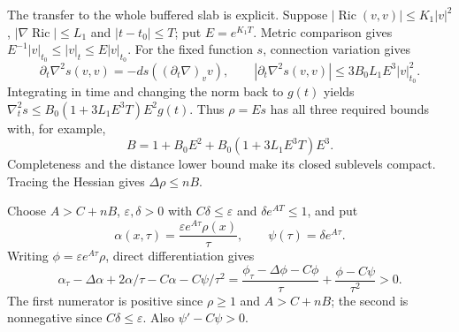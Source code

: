 The transfer to the whole buffered slab is explicit.  Suppose
$|\operatorname{Ric}(v,v)|\leq K_1|v|^2$,
$|\nabla\operatorname{Ric}|\leq L_1$ and $|t-t_0|\leq T$;
put $E=e^{K_1T}$.  Metric comparison gives
$E^{-1}|v|_{t_0}\leq|v|_t\leq E|v|_{t_0}$.
For the fixed function $s$, connection variation gives
\[
 \partial_t\nabla^2s(v,v)=-ds((\partial_t\nabla)_vv),\qquad
 |\partial_t\nabla^2s(v,v)|
 \leq3B_0L_1E^3|v|_{t_0}^2.
\]
Integrating in time and changing the norm back to $g(t)$ yields
$\nabla_t^2s\leq B_0(1+3L_1E^3T)E^2g(t)$.
Thus $\rho=Es$ has all three required bounds with, for example,
\[
 B=1+B_0E^2+B_0(1+3L_1E^3T)E^3.
\]
Completeness and the distance lower bound make its closed sublevels
compact.  Tracing the Hessian gives $\Delta\rho\leq nB$.

Choose $A>C+nB$, $\varepsilon,\delta>0$ with $C\delta\leq\varepsilon$
and $\delta e^{AT}\leq1$, and put
\[
 \alpha(x,\tau)=\frac{\varepsilon e^{A\tau}\rho(x)}{\tau},
 \qquad \psi(\tau)=\delta e^{A\tau}.
\]
Writing $\phi=\varepsilon e^{A\tau}\rho$, direct differentiation gives
\[
 \alpha_\tau-\Delta\alpha+2\alpha/\tau-C\alpha-C\psi/\tau^2
 =\frac{\phi_\tau-\Delta\phi-C\phi}{\tau}
                         +\frac{\phi-C\psi}{\tau^2}>0.
\]
The first numerator is positive since $\rho\geq1$ and
$A>C+nB$; the second is nonnegative since $C\delta\leq\varepsilon$.
Also $\psi'-C\psi>0$.

